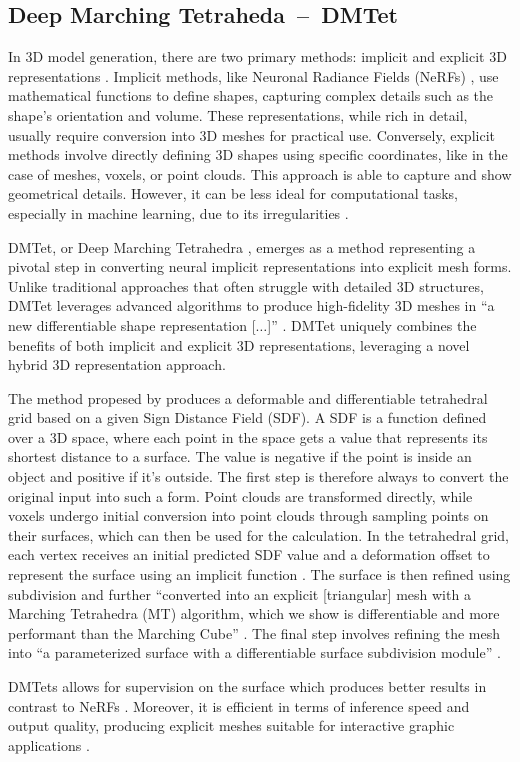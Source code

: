 \subsection{Deep Marching Tetraheda~--~DMTet}\label{DMTet}

In 3D model generation, there are two primary methods: implicit and explicit 3D representations \citep{shen2021DMTet}. Implicit methods, like Neuronal Radiance Fields (NeRFs) \citep{mildenhallNERF}, use mathematical functions to define shapes, capturing complex details such as the shape's orientation and volume. These representations, while rich in detail, usually require conversion into 3D meshes for practical use. Conversely, explicit methods involve directly defining 3D shapes using specific coordinates, like in the case of meshes, voxels, or point clouds. This approach is able to capture and show geometrical details. However, it can be less ideal for computational tasks, especially in machine learning, due to its irregularities \citep{michalkiewicz2019deep}.

DMTet, or Deep Marching Tetrahedra \citep{shen2021DMTet}, emerges as a method representing a pivotal step in converting neural implicit representations into explicit mesh forms. Unlike traditional approaches that often struggle with detailed 3D structures, DMTet leverages advanced algorithms to produce high-fidelity 3D meshes in ``a new differentiable shape representation [\(\ldots\)]'' \citep{shen2021DMTet}. DMTet uniquely combines the benefits of both implicit and explicit 3D representations, leveraging a novel hybrid 3D representation approach.

The method propesed by \citeauthor{shen2021DMTet} produces a deformable and differentiable tetrahedral grid based on a given Sign Distance Field (SDF). A SDF is a function defined over a 3D space, where each point in the space gets a value that represents its shortest distance to a surface. The value is negative if the point is inside an object and positive if it's outside. The first step is therefore always to convert the original input into such a form. Point clouds are transformed directly, while voxels undergo initial conversion into point clouds through sampling points on their surfaces, which can then be used for the calculation. In the tetrahedral grid, each vertex receives an initial predicted SDF value and a deformation offset to represent the surface using an implicit function \citep{shen2021DMTet}. The surface is then refined using subdivision and further ``converted into an explicit [triangular] mesh with a Marching Tetrahedra (MT) algorithm, which we show is differentiable and more performant than the Marching Cube'' \citep{shen2021DMTet}. The final step involves refining the mesh into ``a parameterized surface with a differentiable surface subdivision module'' \citep{shen2021DMTet}.

DMTets allows for supervision on the surface which produces better results in contrast to NeRFs \citep{shen2021DMTet}. Moreover, it is efficient in terms of inference speed and output quality, producing explicit meshes suitable for interactive graphic applications \citep{shen2021DMTet}.